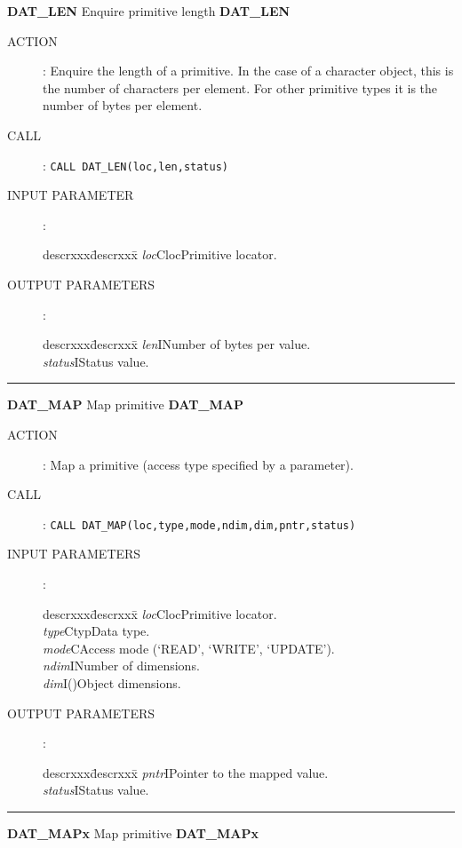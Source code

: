 {\Large {\bf DAT\_LEN} \hfill Enquire primitive length \hfill {\bf DAT\_LEN}}
\begin{description}
\item [ACTION]:
Enquire the length of a primitive. In the case of a character object, this is
the number of characters per element. For other primitive types it is the
number of bytes per element.
\item [CALL]:
{\tt CALL DAT\_LEN(loc,len,status)}
\item [INPUT PARAMETER]:
\begin{tabbing}
descrxxx\=descrxxx\=\kill
{\em loc}\>Cloc\>Primitive locator.
\end{tabbing}
\item [OUTPUT PARAMETERS]:
\begin{tabbing}
descrxxx\=descrxxx\=\kill
{\em len}\>I\>Number of bytes per value.\\
{\em status}\>I\>Status value.
\end{tabbing}
\end{description}
\goodbreak
\rule{\textwidth}{0.3mm}
{\Large {\bf DAT\_MAP} \hfill Map primitive \hfill {\bf DAT\_MAP}}
\begin{description}
\item [ACTION]:
Map a primitive (access type specified by a parameter).
\item [CALL]:
{\tt CALL DAT\_MAP(loc,type,mode,ndim,dim,pntr,status)}
\item [INPUT PARAMETERS]:
\begin{tabbing}
descrxxx\=descrxxx\=\kill
{\em loc}\>Cloc\>Primitive locator.\\
{\em type}\>Ctyp\>Data type.\\
{\em mode}\>C\>Access mode (`READ', `WRITE', `UPDATE').\\
{\em ndim}\>I\>Number of dimensions.\\
{\em dim}\>I()\>Object dimensions.
\end{tabbing}
\item [OUTPUT PARAMETERS]:
\begin{tabbing}
descrxxx\=descrxxx\=\kill
{\em pntr}\>I\>Pointer to the mapped value.\\
{\em status}\>I\>Status value.
\end{tabbing}
\end{description}
\goodbreak
\rule{\textwidth}{0.3mm}
{\Large {\bf DAT\_MAPx} \hfill Map primitive \hfill {\bf DAT\_MAPx}}
